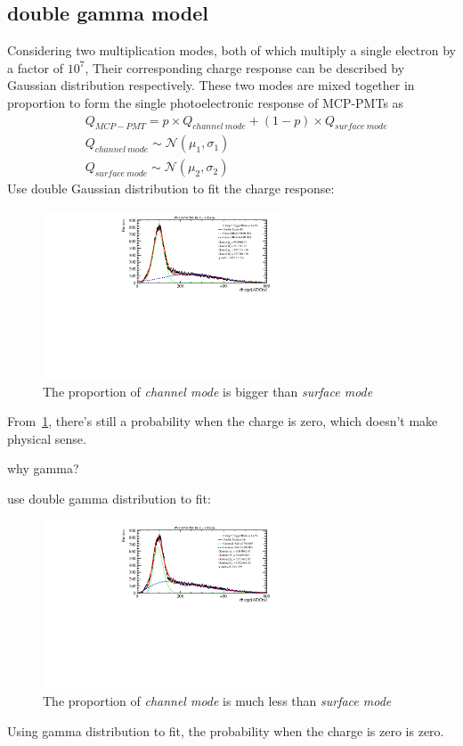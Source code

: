 \documentclass{article}
\begin{document}
\subsection{double gamma model}\label{subsec:doublegamma}
Considering two multiplication modes, both of which multiply a single electron by a factor of $10^7$, 
Their corresponding charge response can be described by Gaussian distribution respectively. 
These two modes are mixed together in proportion to form the single photoelectronic response of MCP-PMTs as 
\begin{equation}
    \label{eq:doublegaus}
    \begin{aligned}
        & Q_{MCP-PMT} = p\times Q_{channel\  mode} + (1-p)\times Q_{surface\  mode} \\
        & Q_{channel\  mode} \sim \mathcal{N} (\mu_1, \sigma_1) \\
        & Q_{surface\  mode} \sim \mathcal{N} (\mu_2, \sigma_2)
    \end{aligned}
\end{equation}
Use double Gaussian distribution to fit the charge response:
\begin{figure}[ht]
    \centering
    \includegraphics[height=5cm]{pic/doubleGauss.pdf}
    \caption{The proportion of \textit{channel mode} is bigger than \textit{surface mode}}\label{fig:doubleGauss}
\end{figure}

From~\ref{fig:doubleGauss}, there's still a probability when the charge is zero, which doesn't make physical sense.

why gamma?

use double gamma distribution to fit:
\begin{figure}[ht]
    \centering
    \includegraphics[height=5cm]{pic/doubleGamma.pdf}
    \caption{The proportion of \textit{channel mode} is much less than \textit{surface mode}}\label{fig:doubleGamma}
\end{figure}
Using gamma distribution to fit, the probability when the charge is zero is zero. 
\end{document}
